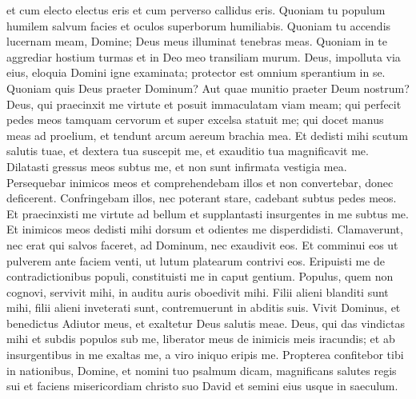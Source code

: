 \begin{biblechapter}
\verse et cum electo electus eris et cum perverso callidus eris. 
\verse Quoniam tu populum humilem salvum facies et oculos superborum humiliabis. 
\verse Quoniam tu accendis lucernam meam, Domine; Deus meus illuminat tenebras meas. 
\verse Quoniam in te aggrediar hostium turmas et in Deo meo transiliam murum. 
\verse Deus, impolluta via eius, eloquia Domini igne examinata; protector est omnium sperantium in se. 
\verse Quoniam quis Deus praeter Dominum? Aut quae munitio praeter Deum nostrum? 
\verse Deus, qui praecinxit me virtute et posuit immaculatam viam meam; 
\verse qui perfecit pedes meos tamquam cervorum et super excelsa statuit me; 
\verse qui docet manus meas ad proelium, et tendunt arcum aereum brachia mea. 
\verse Et dedisti mihi scutum salutis tuae, et dextera tua suscepit me, et exauditio tua magnificavit me. 
\verse Dilatasti gressus meos subtus me, et non sunt infirmata vestigia mea. 
\verse Persequebar inimicos meos et comprehendebam illos et non convertebar, donec deficerent. 
\verse Confringebam illos, nec poterant stare, cadebant subtus pedes meos. 
\verse Et praecinxisti me virtute ad bellum et supplantasti insurgentes in me subtus me. 
\verse Et inimicos meos dedisti mihi dorsum et odientes me disperdidisti. 
\verse Clamaverunt, nec erat qui salvos faceret, ad Dominum, nec exaudivit eos. 
\verse Et comminui eos ut pulverem ante faciem venti, ut lutum platearum contrivi eos. 
\verse Eripuisti me de contradictionibus populi, constituisti me in caput gentium. Populus, quem non cognovi, servivit mihi, 
\verse in auditu auris oboedivit mihi. Filii alieni blanditi sunt mihi, 
\verse filii alieni inveterati sunt, contremuerunt in abditis suis. 
\verse Vivit Dominus, et benedictus Adiutor meus, et exaltetur Deus salutis meae. 
\verse Deus, qui das vindictas mihi et subdis populos sub me, liberator meus de inimicis meis iracundis; 
\verse et ab insurgentibus in me exaltas me, a viro iniquo eripis me. 
\verse Propterea confitebor tibi in nationibus, Domine, et nomini tuo psalmum dicam, 
\verse magnificans salutes regis sui et faciens misericordiam christo suo David et semini eius usque in saeculum. 
\end{biblechapter}

